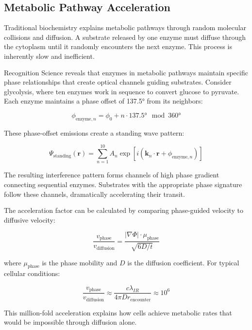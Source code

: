 \documentclass[12pt,a4paper]{report}
\begin{document}
\subsection{Metabolic Pathway Acceleration}

Traditional biochemistry explains metabolic pathways through random molecular collisions and diffusion. A substrate released by one enzyme must diffuse through the cytoplasm until it randomly encounters the next enzyme. This process is inherently slow and inefficient.

Recognition Science reveals that enzymes in metabolic pathways maintain specific phase relationships that create optical channels guiding substrates. Consider glycolysis, where ten enzymes work in sequence to convert glucose to pyruvate. Each enzyme maintains a phase offset of 137.5° from its neighbors:

\begin{equation}
\phi_{\text{enzyme},n} = \phi_0 + n \cdot 137.5° \mod 360°
\end{equation}

These phase-offset emissions create a standing wave pattern:

\begin{equation}
\Psi_{\text{standing}}(\mathbf{r}) = \sum_{n=1}^{10} A_n \exp[i(\mathbf{k}_n \cdot \mathbf{r} + \phi_{\text{enzyme},n})]
\end{equation}

The resulting interference pattern forms channels of high phase gradient connecting sequential enzymes. Substrates with the appropriate phase signature follow these channels, dramatically accelerating their transit.

The acceleration factor can be calculated by comparing phase-guided velocity to diffusive velocity:

\begin{equation}
\frac{v_{\text{phase}}}{v_{\text{diffusion}}} = \frac{|\nabla\Phi| \cdot \mu_{\text{phase}}}{\sqrt{6D/t}}
\end{equation}

where $\mu_{\text{phase}}$ is the phase mobility and $D$ is the diffusion coefficient. For typical cellular conditions:

\begin{equation}
\frac{v_{\text{phase}}}{v_{\text{diffusion}}} \approx \frac{c \lambda_{IR}}{4\pi D r_{\text{encounter}}} \approx 10^6
\end{equation}

This million-fold acceleration explains how cells achieve metabolic rates that would be impossible through diffusion alone.
\end{document}
